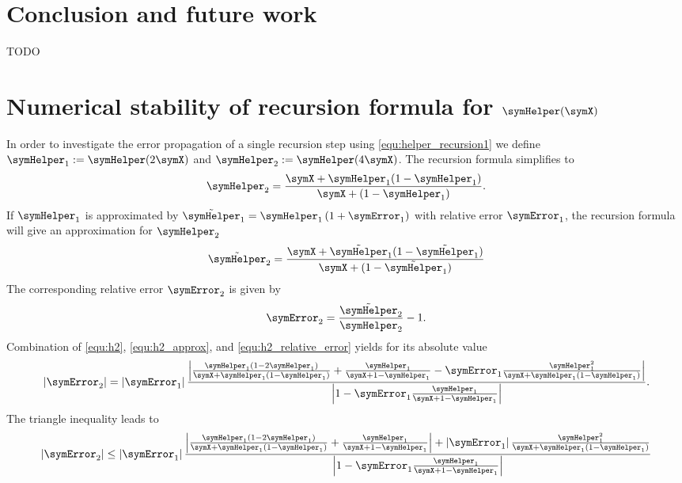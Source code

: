 \documentclass[a4paper]{scrartcl}
\begin{document}
\section{Conclusion and future work}

TODO

\appendix

\section{Numerical stability of recursion formula for $\symHelper(\symX)$}
\label{app:helper_stable}
In order to investigate the error propagation of a single recursion step using \eqref{equ:helper_recursion1} we define $\symHelper_1 := \symHelper(2\symX)$ and $\symHelper_2 := \symHelper(4\symX)$. The recursion formula simplifies to
\begin{equation}
\label{equ:h2}
\symHelper_2 = \frac{\symX+\symHelper_1(1-\symHelper_1)}{\symX+(1-\symHelper_1)}.
\end{equation}
If $\symHelper_1$ is approximated by $\tilde{\symHelper}_1 = \symHelper_1\left(1+\symError_1\right)$ with relative error $\symError_1$, the recursion formula will give an approximation for $\symHelper_2$
\begin{equation}
\label{equ:h2_approx}
\tilde{\symHelper}_2 = 
\frac{\symX+\tilde{\symHelper}_1(1-\tilde{\symHelper}_1)}{\symX+(1-\tilde{\symHelper}_1)}
\end{equation}
The corresponding relative error $\symError_2$ is given by
\begin{equation}
\label{equ:h2_relative_error}
\symError_2 = \frac{\tilde{\symHelper}_2}{\symHelper_2}-1.
\end{equation}
Combination of \eqref{equ:h2}, \eqref{equ:h2_approx}, and \eqref{equ:h2_relative_error} yields for its absolute value
\begin{equation}
\left|\symError_2\right|
=
\left|\symError_1\right|
\frac{
\left|
\frac{\symHelper_1\left(1-2\symHelper_1\right)}{\symX+\symHelper_1\left(1-\symHelper_1\right)}
+
\frac{\symHelper_1}{\symX+1-\symHelper_1}
-
\symError_1
\frac{\symHelper_1^2}{\symX+\symHelper_1\left(1-\symHelper_1\right)}
\right|
}{
\left|
1-
\symError_1
\frac{\symHelper_1}{\symX+1-\symHelper_1}
\right|
}.
\end{equation}
The triangle inequality leads to
\begin{equation}
\left|\symError_2\right|
\leq
\left|\symError_1\right|
\frac{
\left|
\frac{\symHelper_1\left(1-2\symHelper_1\right)}{\symX+\symHelper_1\left(1-\symHelper_1\right)}
+
\frac{\symHelper_1}{\symX+1-\symHelper_1}
\right|
+
\left|
\symError_1
\right|
\frac{\symHelper_1^2}{\symX+\symHelper_1\left(1-\symHelper_1\right)}
}{
\left|
1-
\symError_1
\frac{\symHelper_1}{\symX+1-\symHelper_1}
\right|
}
\end{equation}
\end{document}
